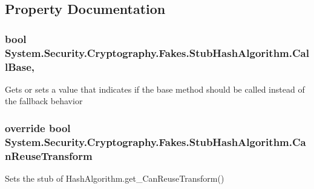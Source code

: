 \subsection{Property Documentation}
\hypertarget{class_system_1_1_security_1_1_cryptography_1_1_fakes_1_1_stub_hash_algorithm_a1fb9283973a56bb174d208422fad8571}{
\subsubsection[{Call\-Base}]{\setlength{\rightskip}{0pt plus 5cm}bool System.\-Security.\-Cryptography.\-Fakes.\-Stub\-Hash\-Algorithm.\-Call\-Base\hspace{0.3cm}{\ttfamily [get]}, {\ttfamily [set]}}}\label{class_system_1_1_security_1_1_cryptography_1_1_fakes_1_1_stub_hash_algorithm_a1fb9283973a56bb174d208422fad8571}


Gets or sets a value that indicates if the base method should be called instead of the fallback behavior

\hypertarget{class_system_1_1_security_1_1_cryptography_1_1_fakes_1_1_stub_hash_algorithm_a8a78f653f31c126497a195e3c902abfd}{
\subsubsection[{Can\-Reuse\-Transform}]{\setlength{\rightskip}{0pt plus 5cm}override bool System.\-Security.\-Cryptography.\-Fakes.\-Stub\-Hash\-Algorithm.\-Can\-Reuse\-Transform\hspace{0.3cm}{\ttfamily [get]}}}\label{class_system_1_1_security_1_1_cryptography_1_1_fakes_1_1_stub_hash_algorithm_a8a78f653f31c126497a195e3c902abfd}


Sets the stub of Hash\-Algorithm.\-get\-\_\-\-Can\-Reuse\-Transform()

